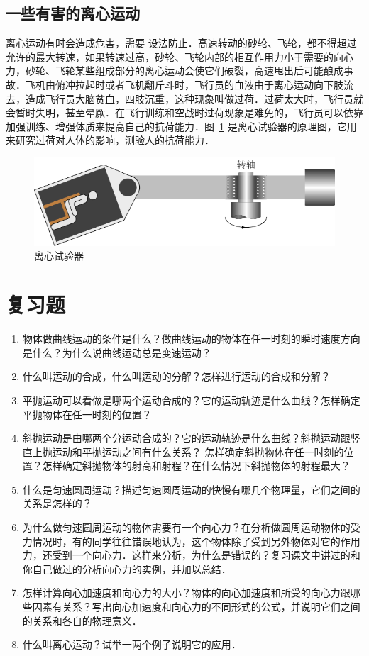 \subsection{一些有害的离心运动} 

离心运动有时会造成危害，需要
设法防止．高速转动的砂轮、飞轮，都不得超过允许的最大转速，如果转速过高，砂轮、飞轮内部的相互作用力小于需要的向心力，砂轮、飞轮某些组成部分的离心运动会使它们破裂，高速甩出后可能酿成事故．飞机由俯冲拉起时或者飞机翻斤斗时，飞行员的血液由于离心运动向下肢流去，造成飞行员大脑贫血，四肢沉重，这种现象叫做过荷．过荷太大时，飞行员就会暂时失明，甚至晕厥．在飞行训练和空战时过荷现象是难免的，飞行员可以依靠加强训练、增强体质来提高自己的抗荷能力．图~\ref{fig_A_4-31} 是离心试验器的原理图，它用来研究过荷对人体的影响，测验人的抗荷能力．
\begin{figure}[htbp]
    \centering
    \includegraphics{fig/A/4-31.pdf}
    \caption{离心试验器}\label{fig_A_4-31}
\end{figure}

\section*{复习题}

\begin{enumerate}
    \item 物体做曲线运动的条件是什么？做曲线运动的物体在任一时刻的瞬时速度方向是什么？为什么说曲线运动总是变速运动？
\item 什么叫运动的合成，什么叫运动的分解？怎样进行运动的合成和分解？
\item 平抛运动可以看做是哪两个运动合成的？它的运动轨迹是什么曲线？怎样确定平抛物体在任一时刻的位置？
\item 斜抛运动是由哪两个分运动合成的？它的运动轨迹是什么曲线？斜抛运动跟竖直上抛运动和平抛运动之间有什么关系？
怎样确定斜抛物体在任一时刻的位置？怎样确定斜抛物体的射高和射程？在什么情况下斜抛物体的射程最大？
\item 什么是匀速圆周运动？描述匀速圆周运动的快慢有哪几个物理量，它们之间的关系是怎样的？
\item 为什么做匀速圆周运动的物体需要有一个向心力？在分析做圆周运动物体的受力情况时，有的同学往往错误地认为，这个物体除了受到另外物体对它的作用力，还受到一个向心力．这样来分析，为什么是错误的？复习课文中讲过的和你自己做过的分析向心力的实例，并加以总结．
\item 怎样计算向心加速度和向心力的大小？物体的向心加速度和所受的向心力跟哪些因素有关系？写出向心加速度和向心力的不同形式的公式，并说明它们之间的关系和各自的物理意义．
\item  什么叫离心运动？试举一两个例子说明它的应用．
\end{enumerate}


